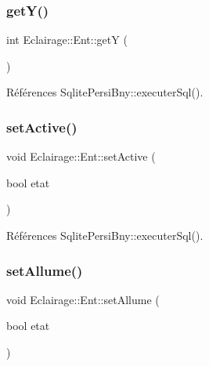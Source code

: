 \mbox{\label{classEclairage_1_1Ent_a12a54fa5d966278eefc4b035142ade70}} 
\subsubsection{\texorpdfstring{get\+Y()}{getY()}}
{\footnotesize\ttfamily int Eclairage\+::\+Ent\+::getY (\begin{DoxyParamCaption}{ }\end{DoxyParamCaption})\hspace{0.3cm}{\ttfamily [virtual]}}



Références Sqlite\+Persi\+Bny\+::executer\+Sql().

\mbox{\label{classEclairage_1_1Ent_a1e9471a412f746a2284778c8d9548499}} 
\subsubsection{\texorpdfstring{set\+Active()}{setActive()}}
{\footnotesize\ttfamily void Eclairage\+::\+Ent\+::set\+Active (\begin{DoxyParamCaption}\item[{bool}]{etat }\end{DoxyParamCaption})\hspace{0.3cm}{\ttfamily [virtual]}}



Références Sqlite\+Persi\+Bny\+::executer\+Sql().

\mbox{\label{classEclairage_1_1Ent_a3c9d21bd3c725857050e39eb449d1ad5}} 
\subsubsection{\texorpdfstring{set\+Allume()}{setAllume()}}
{\footnotesize\ttfamily void Eclairage\+::\+Ent\+::set\+Allume (\begin{DoxyParamCaption}\item[{bool}]{etat }\end{DoxyParamCaption})\hspace{0.3cm}{\ttfamily [virtual]}}



